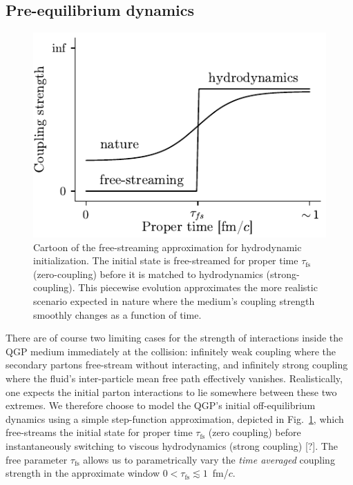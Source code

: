 \documentclass[aps,prc,reprint,amsmath,nofootinbib]{revtex4-1}
\newcommand{\taufs}{\tau_\mathrm{fs}}
\newcommand{\note}{\textcolor{theblue}{[?]}}
\begin{document}
\subsection{Pre-equilibrium dynamics}

\begin{figure}[b]
  \includegraphics{fig/coupling}
  \caption{\label{fig:freestream} Cartoon of the free-streaming approximation for hydrodynamic initialization. The initial state is free-streamed for proper time $\taufs$ (zero-coupling) before it is matched to hydrodynamics (strong-coupling). This piecewise evolution approximates the more realistic scenario expected in nature where the medium's coupling strength smoothly changes as a function of time.}
\end{figure}

There are of course two limiting cases for the strength of interactions inside the QGP medium immediately at the collision: infinitely weak coupling where the secondary partons free-stream without interacting, and infinitely strong coupling where the fluid's inter-particle mean free path effectively vanishes.
Realistically, one expects the initial parton interactions to lie somewhere between these two extremes.
We therefore choose to model the QGP's initial off-equilibrium dynamics using a simple step-function approximation, depicted in Fig.~\ref{fig:freestream}, which free-streams the initial state for proper time $\taufs$ (zero coupling) before instantaneously switching to viscous hydrodynamics (strong coupling) \note.
The free parameter $\taufs$ allows us to parametrically vary the \emph{time averaged} coupling strength in the approximate window $0 < \taufs \lesssim1$~fm/$c$.
\end{document}

